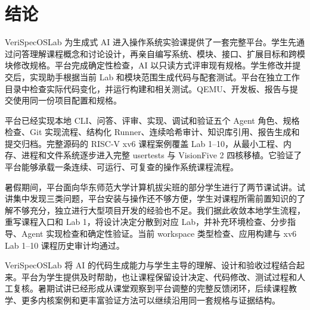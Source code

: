 \chapter{结论}

VeriSpecOSLab 为生成式 AI 进入操作系统实验课提供了一套完整平台。学生先通过问答理解课程概念和讨论设计，再亲自编写系统、模块、接口、扩展目标和跨模块修改规格。平台完成确定性检查，AI 以只读方式评审现有规格。学生修改并提交后，实现助手根据当前 Lab 和模块范围生成代码与配套测试。平台在独立工作目录中检查实际代码变化，并运行构建和相关测试。QEMU、开发板、报告与提交使用同一份项目配置和规格。

平台已经实现本地 CLI、问答、评审、实现、调试和验证五个 Agent 角色、规格检查、Git 实现流程、结构化 Runner、连续哈希审计、知识库引用、报告生成和提交归档。完整源码的 RISC-V xv6 课程案例覆盖 Lab 1--10，从最小工程、内存、进程和文件系统逐步进入完整 usertests 与 VisionFive 2 四核移植。它验证了平台能够承载一条连续、可运行、可复查的操作系统课程流程。

暑假期间，平台面向华东师范大学计算机拔尖班的部分学生进行了两节课试讲。试讲集中发现三类问题，平台安装与操作还不够方便，学生对课程所需前置知识的了解不够充分，独立进行大型项目开发的经验也不足。我们据此收敛本地学生流程，重写课程入口和 Lab 1，将设计决定分散到对应 Lab，并补充环境检查、分步指导、Agent 实现检查和确定性验证。当前 workspace 类型检查、应用构建与 xv6 Lab 1--10 课程历史审计均通过。

VeriSpecOSLab 将 AI 的代码生成能力与学生主导的理解、设计和验收过程结合起来。平台为学生提供及时帮助，也让课程保留设计决定、代码修改、测试过程和人工复核。暑期试讲已经形成从课堂观察到平台调整的完整反馈闭环，后续课程教学、更多内核案例和更丰富验证方法可以继续沿用同一套规格与证据结构。
